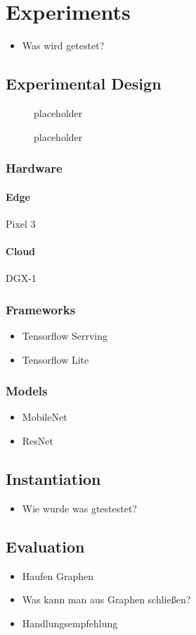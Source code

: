 \chapter{Experiments}
\begin{itemize}
    \item Was wird getestet?
\end{itemize}
\section{Experimental Design}
\begin{figure}[H]
\centering

\caption{placeholder}
\label{fig:cloud}
\end{figure}
\begin{figure}[H]
\centering

\caption{placeholder}
\label{fig:edge}
\end{figure}
\subsection{Hardware}
\subsubsection{Edge}
Pixel 3
\subsubsection{Cloud}
DGX-1
\subsection{Frameworks}
\begin{itemize}
    \item Tensorflow Serrving
    \item Tensorflow Lite
\end{itemize}
\subsection{Models}
\begin{itemize}
    \item MobileNet
    \item ResNet
\end{itemize}

\section{Instantiation}
\begin{itemize}
    \item Wie wurde was gtestestet?
\end{itemize}
\section{Evaluation}
\begin{itemize}
    \item Haufen Graphen
    \item Was kann man aus Graphen schließen?
    \item Handlungsempfehlung
\end{itemize}
\endinput 
